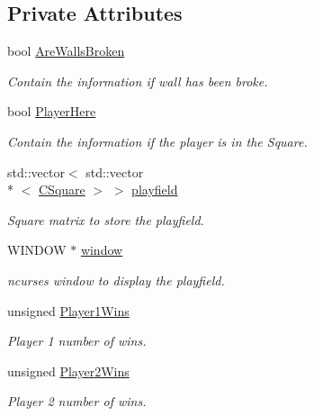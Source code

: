 \subsection*{Private Attributes}
\begin{DoxyCompactItemize}
\item 
\hypertarget{class_c_board_a1a26c9148c5db7c9770f58c9881d7232}{bool \hyperlink{class_c_board_a1a26c9148c5db7c9770f58c9881d7232}{Are\-Walls\-Broken}}\label{class_c_board_a1a26c9148c5db7c9770f58c9881d7232}

\begin{DoxyCompactList}\small\item\em Contain the information if wall has been broke. \end{DoxyCompactList}\item 
bool \hyperlink{class_c_board_a1c54c3f6d57fad2c447cbabcb66d2e29}{Player\-Here}
\begin{DoxyCompactList}\small\item\em Contain the information if the player is in the Square. \end{DoxyCompactList}\item 
\hypertarget{class_c_board_ad78413ab7d844c5826450f53e38d924a}{std\-::vector$<$ std\-::vector\\*
$<$ \hyperlink{class_c_square}{C\-Square} $>$ $>$ \hyperlink{class_c_board_ad78413ab7d844c5826450f53e38d924a}{playfield}}\label{class_c_board_ad78413ab7d844c5826450f53e38d924a}

\begin{DoxyCompactList}\small\item\em Square matrix to store the playfield. \end{DoxyCompactList}\item 
\hypertarget{class_c_board_a6dd7907777f3ea059b353006259ab8ee}{W\-I\-N\-D\-O\-W $\ast$ \hyperlink{class_c_board_a6dd7907777f3ea059b353006259ab8ee}{window}}\label{class_c_board_a6dd7907777f3ea059b353006259ab8ee}

\begin{DoxyCompactList}\small\item\em ncurses window to display the playfield. \end{DoxyCompactList}\item 
\hypertarget{class_c_board_af3a56318bcaff150a5d966cb49a93dfb}{unsigned \hyperlink{class_c_board_af3a56318bcaff150a5d966cb49a93dfb}{Player1\-Wins}}\label{class_c_board_af3a56318bcaff150a5d966cb49a93dfb}

\begin{DoxyCompactList}\small\item\em Player 1 number of wins. \end{DoxyCompactList}\item 
\hypertarget{class_c_board_a9c44eb7e2e32c9b10eac874fb3fa1bb3}{unsigned \hyperlink{class_c_board_a9c44eb7e2e32c9b10eac874fb3fa1bb3}{Player2\-Wins}}\label{class_c_board_a9c44eb7e2e32c9b10eac874fb3fa1bb3}

\begin{DoxyCompactList}\small\item\em Player 2 number of wins. \end{DoxyCompactList}\end{DoxyCompactItemize}


